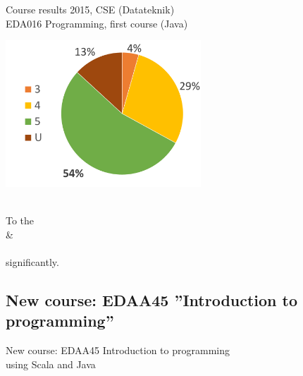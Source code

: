 \documentclass{lecturenotes}
\begin{document}
\begin{Slide}{Course results 2015, CSE (Datateknik)\\EDA016 Programming, first course (Java)}
\begin{multicols}{2}

  \vspace{1em}

\includegraphics[width=0.55\textwidth]{img/grades-2015}

\columnbreak

\raggedleft {} \\
To  the \\  \& \\   \\ significantly.
\end{multicols}
\end{Slide}

\subsection[New course: EDAA45 ''Introduction to programming'']{New course: EDAA45 ''Introduction to programming''}


\begin{Slide}{New course: EDAA45 Introduction to programming \\ using Scala and Java}
\noindent\resizebox{0.8\columnwidth}{!}{

}
\end{Slide}
\end{document}
